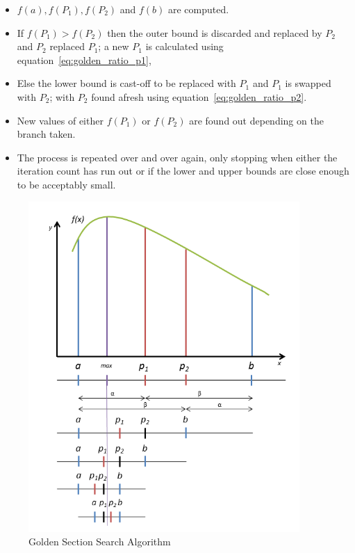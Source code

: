 {\begin{itemize}
\begin{equation}
	\begin{aligned}
		 P_{2}=a+\phi(b-a)
		\label{eq:golden_ratio_p2}
	\end{aligned}
\end{equation}


	\item $\textit{f}(a),\textit{f}(P_{1}),\textit{f}(P_{2})$ and $\textit{f}(b)$ are computed.
	\item If $\textit{f}(P_{1}) > \textit{f}(P_{2})$ then the outer bound is discarded and replaced by $ P_{2} $ and $ P_{2}$ replaced $ P_{1}$; a new $ P_{1}$ is calculated using equation~\ref{eq:golden_ratio_p1},
	\item Else the lower bound is cast-off to be replaced with $ P_{1}$ and $ P_{1}$ is swapped with $ P_{2}$; with $ P_{2}$ found afresh using equation~\ref{eq:golden_ratio_p2}.
	\item New values of either $\textit{f}(P_{1})$ or $\textit{f}(P_{2})$ are found out depending on the branch taken.
	\item  The process is repeated over and over again, only stopping when either the iteration count has run out or if the lower and upper bounds are close enough to be acceptably small. 
\end{itemize}

 
\begin{figure}[H]
  \begin{center}
  \includegraphics[width=0.92\textwidth]{images/Golden_search_curve}
  \caption{ Golden Section Search Algorithm }
  \label{fig:Golden_search_curve}
  \end{center}
  \end{figure}
  
}
